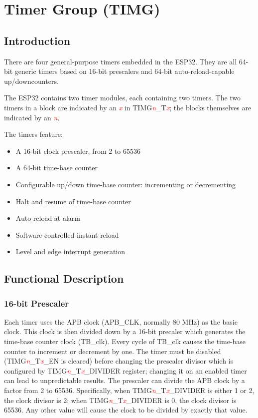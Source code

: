 \documentclass[main\_\_EN.tex]{subfiles}
\begin{document}
\hypertarget{timg}{}
\chapter{Timer Group (TIMG)}
\label{mod:timg}

\section{Introduction}
There are four general-purpose timers embedded in the ESP32. They are all 64-bit generic timers based on 16-bit prescalers and 64-bit auto-reload-capable up/downcounters.

The ESP32 contains two timer modules, each containing two timers. The two timers in a block are indicated by an \textcolor{red}{\it{x}} in TIMG\textcolor{red}{\it{n}}\_T\textcolor{red}{\it{x}}; the blocks themselves are indicated by an \textcolor{red}{\it{n}}.

The timers feature:
\begin{itemize}
    \item A 16-bit clock prescaler, from 2 to 65536
    \item A 64-bit time-base counter
    \item Configurable up/down time-base counter: incrementing or decrementing
    \item Halt and resume of time-base counter
    \item Auto-reload at alarm
    \item Software-controlled instant reload
    \item Level and edge interrupt generation
\end{itemize}
\section{Functional Description}

\subsection{16-bit Prescaler}
Each timer uses the APB clock (APB\_CLK, normally 80 MHz) as the basic clock. This clock is then divided down by a 16-bit precaler which generates the time-base counter clock (TB\_clk). Every cycle of TB\_clk causes the time-base counter to increment or decrement by one. The timer must be disabled (TIMG\textcolor{red}{\it{n}}\_T\textcolor{red}{\it{x}}\_EN is cleared) before changing the prescaler divisor which is configured by TIMG\textcolor{red}{\it{n}}\_T\textcolor{red}{\it{x}}\_DIVIDER register; changing it on an enabled timer can lead to unpredictable results. The prescaler can divide the APB clock by a factor from 2 to 65536. Specifically, when TIMG\textcolor{red}{\it{n}}\_T\textcolor{red}{\it{x}}\_DIVIDER is either 1 or 2, the clock divisor is 2; when TIMG\textcolor{red}{\it{n}}\_T\textcolor{red}{\it{x}}\_DIVIDER is 0, the clock divisor is 65536. Any other value will cause the clock to be divided by exactly that value.
\end{document}
